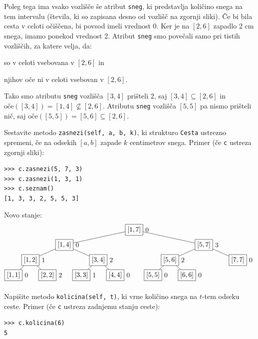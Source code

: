 \documentclass[arhiv]{../izpit}
\begin{document}
Poleg tega ima vsako vozlišče še atribut \texttt{sneg}, ki predstavlja količino snega na tem intervalu (števila, ki so zapisana desno od vozlišč na zgornji sliki). Če bi bila cesta v celoti očiščena, bi povsod imeli vrednost $0$. Ker je na $[2, 6]$ zapadlo 2 cm snega, imamo ponekod vrednost 2. Atribut \texttt{sneg} smo povečali samo pri tistih vozliščih, za katere velja, da:
\begin{compactenum}
\renewcommand{\labelenumi}{\alph{enumi})}
\item so v celoti vsebovana v $[2, 6]$ in
\item njihov oče ni v celoti vsebovan v $[2, 6]$.
\end{compactenum}
Tako smo atributu \texttt{sneg} vozlišča $[3, 4]$ prišteli 2, saj $[3, 4] \subseteq [2, 6]$ in $\mathrm{oče}([3, 4]) = [1, 4] \nsubseteq [2, 6]$. Atributu \texttt{sneg} vozlišča $[5, 5]$ pa nismo prišteli nič, saj $\mathrm{oče}([5, 5]) = [5, 6] \subseteq [2, 6]$.

\podnaloga[10 točk]
Sestavite metodo \texttt{zasnezi(self, a, b, k)}, ki strukturo \texttt{Cesta} ustrezno spremeni, če na odsekih $[a, b]$ zapade $k$ centimetrov snega. Primer (če \texttt{c} ustreza zgornji sliki):
%
\begin{verbatim}
>>> c.zasnezi(5, 7, 3)
>>> c.zasnezi(1, 3, 1)
>>> c.seznam()
[1, 3, 3, 2, 5, 5, 3]
\end{verbatim}
Novo stanje:
$$
\begin{tikzpicture}[level distance=0.8cm,
    level 1/.style={sibling distance=7.4cm},
    level 2/.style={sibling distance=3.6cm},
    level 3/.style={sibling distance=1.8cm}
    ]
    \node[rectangle, draw, label=0:0] (d) {$[1, 7]$}
      child {node[rectangle, draw, label=0:0] {$[1, 4]$}
        child {node[rectangle, draw, label=0:1] {$[1, 2]$}
          child {node[rectangle, draw, label=0:0] {$[1, 1]$}}
          child {node[rectangle, draw, label=0:2] {$[2, 2]$}}
        }
        child {node[rectangle, draw, label=0:2] {$[3, 4]$}
          child {node[rectangle, draw, label=0:1] {$[3, 3]$}}
          child {node[rectangle, draw, label=0:0] {$[4, 4]$}}
        }
      }
      child {node[rectangle, draw, label=0:3] {$[5, 7]$}
        child {node[rectangle, draw, label=0:2] {$[5, 6]$}
          child {node[rectangle, draw, label=0:0] {$[5, 5]$}}
          child {node[rectangle, draw, label=0:0] {$[6, 6]$}}
        }
        child {node[rectangle, draw, label=0:0] {$[7, 7]$}}
      };
  \end{tikzpicture}
$$

\podnaloga[10 točk]
Napišite metodo \texttt{kolicina(self, t)}, ki vrne količino snega na $t$-tem odseku ceste. Primer (če \texttt{c} ustreza zadnjemu stanju ceste):
%
\begin{verbatim}
>>> c.kolicina(6)
5
\end{verbatim}
\end{document}
